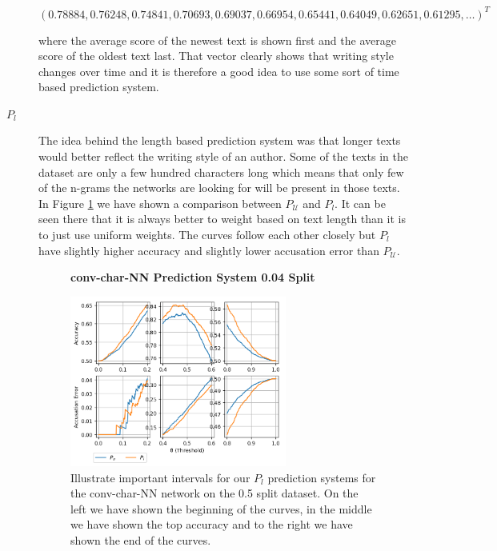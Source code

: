 \begin{description}
        \begin{equation}
            (0.78884, 0.76248, 0.74841, 0.70693, 0.69037, 0.66954, 0.65441,
            0.64049, 0.62651, 0.61295, \dots)^T
        \end{equation}

        where the average score of the newest text is shown first and the
        average score of the oldest text last. That vector clearly shows that
        writing style changes over time and it is therefore a good idea to use
        some sort of time based prediction system.

    \item[$P_l$]

        The idea behind the length based prediction system was that longer
        texts would better reflect the writing style of an author. Some
        of the texts in the dataset are only a few hundred characters
        long which means that only few of the n-grams the networks
        are looking for will be present in those texts. In Figure
        \ref{fig:conv_char_prediction_zoom_50_text_length} we have shown a
        comparison between $P_\mathcal{U}$ and $P_l$. It can be seen there that
        it is always better to weight based on text length than it is to just
        use uniform weights. The curves follow each other closely but $P_l$
        have slightly higher accuracy and slightly lower accusation error than
        $P_\mathcal{U}$.

        \begin{figure}
            \centering
            \textbf{\glsdesc{conv-char-NN} Prediction System 0.04 Split}\par\medskip
            \includegraphics[width=0.7\textwidth]{./pictures/discussion/conv_char_nn_prediction_zoom_50_text_length.png}
            \caption{Illustrate important intervals for our $P_l$ prediction
                systems for the \gls{conv-char-NN} network on the 0.5 split
                dataset. On the left we have shown the beginning of the curves,
                in the middle we have shown the top accuracy and to the right we
                have shown the end of the curves.}
            \label{fig:conv_char_prediction_zoom_50_text_length}
        \end{figure}


\end{description}
